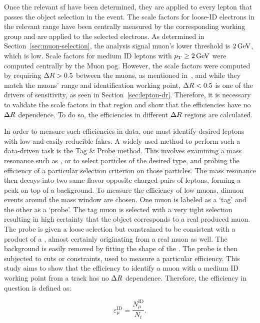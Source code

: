 Once the relevant \gls{sf} have been determined, they are applied to every lepton that passes the object selection in the event. The scale factors for loose-ID electrons in the relevant \pt range have been centrally measured by the corresponding working group and are applied to the selected electrons. As determined in Section~\ref{sec:muon-selection}, the analysis signal muon's lower \pt threshold is $2\,\text{Ge\hspace{-.08em}V}$, which is low. Scale factors for medium ID leptons with $p_{\mathrm{T}}\geq 2\,\text{Ge\hspace{-.08em}V}$ were computed centrally by the Muon \gls{pog}. However, the scale factors were computed by requiring $\Delta R > 0.5$ between the muons, as mentioned in~\cite{muon-id-sf-2016,muon-id-sf-2016-pres}, and while they match the muons' \pt range and identification working point, $\Delta R < 0.5$ is one of the drivers of sensitivity, as seen in Section~\ref{sec:lepton-dr}. Therefore, it is necessary to validate the scale factors in that region and show that the efficiencies have no $\Delta R$ dependence. To do so, the efficiencies in different $\Delta R$ regions are calculated.

In order to measure such efficiencies in data, one must identify desired leptons with low and easily reducible fakes. A widely used method to perform such a data-driven task is the Tag \& Probe method. This involves examining a mass resonance such as \PZ, \JPsi or \PGU to select particles of the desired type, and probing the efficiency of a particular selection criterion on those particles. The mass resonance then decays into two same-flavor opposite charged pairs of leptons, forming a peak on top of a background. To measure the efficiency of low \pt muons, dimuon events around the \JPsi mass window are chosen. One muon is labeled as a `tag' and the other as a `probe'. The tag muon is selected with a very tight selection resulting in high certainty that the object corresponds to a real produced muon. The probe is given a loose selection but constrained to be consistent with a product of a \JPsi, almost certainly originating from a real muon as well. The background is easily removed by fitting the shape of the \JPsi. The probe is then subjected to cuts or constraints, used to measure a particular efficiency. This study aims to show that the efficiency to identify a muon with a medium ID working point from a track has no $\Delta R$ dependence. Therefore, the efficiency in question is defined as:

\begin{equation}
\varepsilon_{\mu}^{\mathrm{ID}} = \frac{N_{\mu}^\mathrm{ID}}{N_{t}}.
\end{equation}

